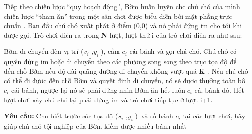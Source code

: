 Tiếp theo chiến lược “quy hoạch động”, Bờm huấn luyện cho chú chó của mình chiến lược “tham ăn” trong một sân chơi được biểu diễn bởi mặt phẳng trực chuẩn                                                   . Ban đầu chú chó xuất phát ở điểm (0,0) và nó phải đứng im cho tới khi được gọi. Trò chơi diễn ra trong   \textbf{    N   }   lượt, lượt thứ   i   của trò chơi diễn ra như sau:  

   Bờm di chuyển đến vị trí ($x_{i}$   ,$y_{i}$   ), cầm $c_{i}$   cái bánh và gọi chú chó. Chú chó có quyền đứng im hoặc di chuyển theo các phương song song theo trục tọa độ để đến chỗ Bờm nếu độ dài quãng đường di chuyển không vượt quá   \textbf{    K   }   . Nếu chú chó có thể đi được đến chỗ Bờm và quyết định di chuyển, nó sẽ được thưởng toàn bộ $c_{i}$   cái bánh, ngược lại nó sẽ phải đứng nhìn Bờm ăn hết luôn $c_{i}$   cái bánh đó. Hết lượt chơi này chú chó lại phải đứng im và trò chơi tiếp tục ở lượt   i+1.

\textbf{    Yêu cầu:   }   Cho biết trước các tọa độ ($x_{i}$   ,$y_{i}$   ) và số bánh $c_{i}$   tại các lượt chơi, hãy giúp chú chó tội nghiệp của Bờm kiếm được nhiều bánh nhất